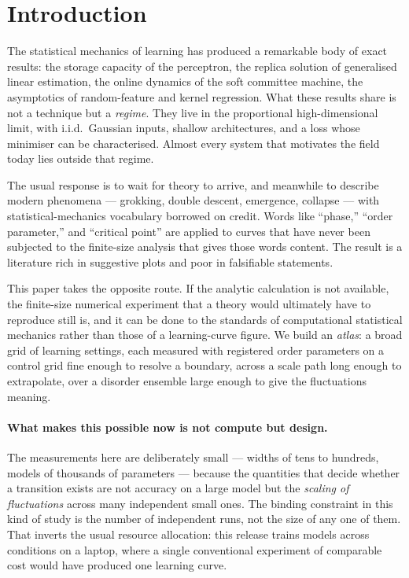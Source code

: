 \section{Introduction}
\label{sec:intro}

The statistical mechanics of learning has produced a remarkable body of exact
results: the storage capacity of the perceptron, the replica solution of
generalised linear estimation, the online dynamics of the soft committee
machine, the asymptotics of random-feature and kernel regression. What these
results share is not a technique but a \emph{regime}. They live in the
proportional high-dimensional limit, with i.i.d.\ Gaussian inputs, shallow
architectures, and a loss whose minimiser can be characterised. Almost every
system that motivates the field today lies outside that regime.

The usual response is to wait for theory to arrive, and meanwhile to describe
modern phenomena --- grokking, double descent, emergence, collapse --- with
statistical-mechanics vocabulary borrowed on credit. Words like ``phase,''
``order parameter,'' and ``critical point'' are applied to curves that have
never been subjected to the finite-size analysis that gives those words
content. The result is a literature rich in suggestive plots and poor in
falsifiable statements.

This paper takes the opposite route. If the analytic calculation is not
available, the finite-size numerical experiment that a theory would ultimately
have to reproduce still is, and it can be done to the standards of
computational statistical mechanics rather than those of a learning-curve
figure. We build an \emph{atlas}: a broad grid of learning settings, each
measured with registered order parameters on a control grid fine enough to
resolve a boundary, across a scale path long enough to extrapolate, over a
disorder ensemble large enough to give the fluctuations meaning.

\paragraph{What makes this possible now is not compute but design.}
The measurements here are deliberately small --- widths of tens to hundreds,
models of thousands of parameters --- because the quantities that decide
whether a transition exists are not accuracy on a large model but the
\emph{scaling of fluctuations} across many independent small ones. The binding
constraint in this kind of study is the number of independent runs, not the
size of any one of them. That inverts the usual resource allocation: this
release trains \AtlasTotalRuns{} models across \AtlasTotalConditions{}
conditions on a laptop, where a single conventional experiment of comparable
cost would have produced one learning curve.

